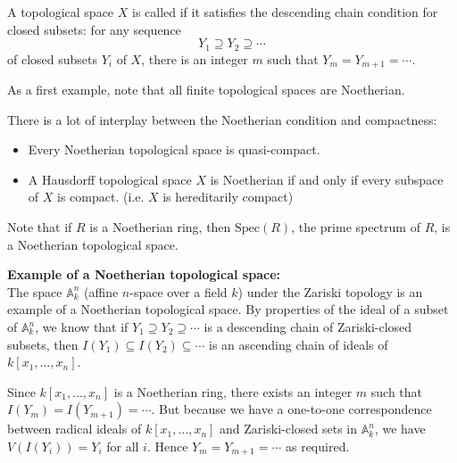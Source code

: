 \documentclass[12pt]{article}
\begin{document}
A topological space $X$ is called {} if it satisfies the descending chain condition for closed subsets: for any sequence 
\[ Y_1 \supseteq Y_2 \supseteq \cdots \]
of closed subsets $Y_i$ of $X$, there is an integer $m$ such that
$Y_m=Y_{m+1}=\cdots$.

As a first example, note that all finite topological spaces are Noetherian.

There is a lot of interplay between the Noetherian condition and compactness:  
\begin{itemize}
\item Every Noetherian topological space is quasi-compact.
\item A Hausdorff topological space $X$ is Noetherian if and only if every subspace of $X$ is compact. (i.e. $X$ is hereditarily compact)
\end{itemize}

Note that if $R$ is a Noetherian ring, then $\text{Spec}(R)$, the prime spectrum of $R$, is a Noetherian topological space.

{\bf Example of a Noetherian topological space:}\\
The space $\mathbb{A}^n_k$ (affine $n$-space over a field $k$) under the Zariski topology is an example of a Noetherian topological space.  By properties of the ideal of a subset of $\mathbb{A}^n_k$, we know that if 
$Y_1 \supseteq Y_2 \supseteq \cdots$ is a descending chain of Zariski-closed subsets, then $I(Y_1) \subseteq I(Y_2) \subseteq \cdots$ is an ascending chain of ideals of $k[x_1,\ldots,x_n]$.

Since $k[x_1,\ldots,x_n]$ is a Noetherian ring, there exists an integer $m$ such that $I(Y_m)=I(Y_{m+1})=\cdots$.  But because we have a one-to-one correspondence between radical ideals of $k[x_1,\ldots,x_n]$ and Zariski-closed sets in $\mathbb{A}^n_k$, we have $V(I(Y_i))=Y_i$ for all $i$.  Hence
$Y_m=Y_{m+1}=\cdots$ as required.
\end{document}
